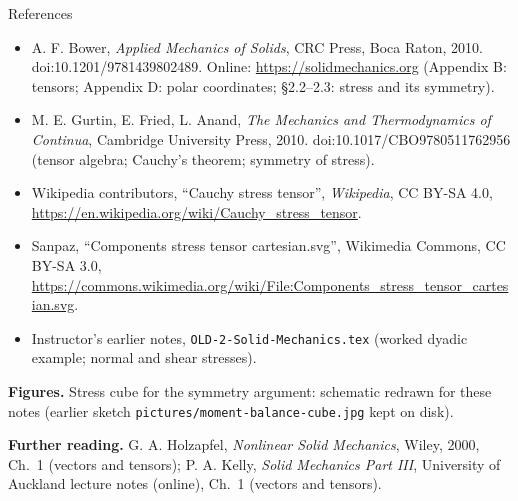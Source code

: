\documentclass[aspectratio=169,11pt]{beamer}
\begin{document}
\begin{frame}{References}
\scriptsize
\begin{itemize}
  \item A. F. Bower, \emph{Applied Mechanics of Solids}, CRC Press, Boca Raton, 2010. doi:10.1201/9781439802489. Online: \url{https://solidmechanics.org} (Appendix B: tensors; Appendix D: polar coordinates; \S2.2--2.3: stress and its symmetry).
  \item M. E. Gurtin, E. Fried, L. Anand, \emph{The Mechanics and Thermodynamics of Continua}, Cambridge University Press, 2010. doi:10.1017/CBO9780511762956 (tensor algebra; Cauchy's theorem; symmetry of stress).
  \item Wikipedia contributors, ``Cauchy stress tensor'', \emph{Wikipedia}, CC BY-SA 4.0, \url{https://en.wikipedia.org/wiki/Cauchy_stress_tensor}.
  \item Sanpaz, ``Components stress tensor cartesian.svg'', Wikimedia Commons, CC BY-SA 3.0, \url{https://commons.wikimedia.org/wiki/File:Components_stress_tensor_cartesian.svg}.
  \item Instructor's earlier notes, \texttt{OLD-2-Solid-Mechanics.tex} (worked dyadic example; normal and shear stresses).
\end{itemize}
\medskip
\textbf{Figures.} Stress cube for the symmetry argument: schematic redrawn for these notes (earlier sketch \texttt{pictures/moment-balance-cube.jpg} kept on disk).

\medskip
\textbf{Further reading.} G. A. Holzapfel, \emph{Nonlinear Solid Mechanics}, Wiley, 2000, Ch.~1 (vectors and tensors); P. A. Kelly, \emph{Solid Mechanics Part III}, University of Auckland lecture notes (online), Ch.~1 (vectors and tensors).
\end{frame}
\end{document}
